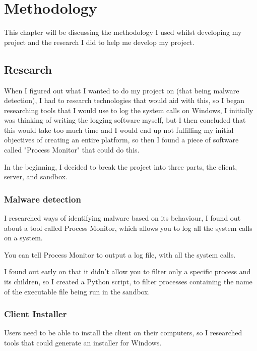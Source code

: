 \chapter{Methodology}

This chapter will be discussing the methodology I used whilst developing my project
and the research I did to help me develop my project.


\section{Research}
When I figured out what I wanted to do my project on (that being malware detection),
I had to research technologies that would aid with this,
so I began researching tools that I would use to log the system calls on Windows,
I initially was thinking of writing the logging software myself,
but I then concluded that this would take too much time and
I would end up not fulfilling my initial objectives of creating an entire platform,
so then I found a piece of software called "Process Monitor" that could do this.

In the beginning, I decided to break the project into three parts,
the client, server, and sandbox.

\subsection{Malware detection}
I researched ways of identifying malware based on its behaviour,
I found out about a tool called Process Monitor, which allows you to log all
the system calls on a system.

You can tell Process Monitor to output a log file, with all the system calls.

I found out early on that it didn't allow you to filter only a
specific process and its children, so I created a Python script, to filter processes
containing the name of the executable file being run in the sandbox.

\subsection{Client Installer}
Users need to be able to install the client on their computers,
so I researched tools that could generate an installer for Windows.


